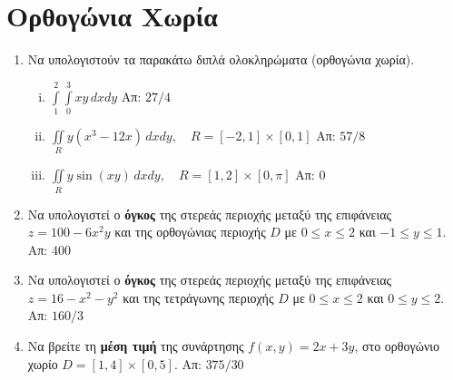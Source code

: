 



\geometry{top=2cm}
\pagestyle{askhseis}
\everymath{\displaystyle}




\begin{center}
  \minibox{\large\bf \textcolor{Col1}{Ασκήσεις Διπλό Ολοκλήρωμα}}
\end{center}


\section*{Ορθογώνια Χωρία}

\begin{enumerate}
  \item Να υπολογιστούν τα παρακάτω διπλά ολοκληρώματα (ορθογώνια χωρία).
    \begin{enumerate}[i)]
      \item $\int\limits_1^2\!\!\!\int\limits_0^ 3xy\,dxdy$ 
        \hfill Απ: ${27}/{4}$ %
      \item $\iint\limits_{R}y(x^3-12x)\,dxdy,\quad R=[-2,1]\times[0,1]$ 
        \hfill Απ: ${57}/{8}$
      \item $ \iint\limits_{R}y\sin(xy)\,dxdy, \quad R=[1,2]\times[0,\pi] $ 
        \hfill Απ: $ 0 $ 
    \end{enumerate}

  \item Να υπολογιστεί ο \textbf{όγκος} της στερεάς περιοχής μεταξύ της επιφάνειας 
    $ z = 100 - 6x^{2}y $ και της ορθογώνιας περιοχής $D$ με 
    $ 0 \leq x \leq 2 $ και $ -1 \leq y \leq 1 $. \hfill Απ: $400$ 

  \item Να υπολογιστεί ο \textbf{όγκος} της στερεάς περιοχής μεταξύ της 
    επιφάνειας $ z= 16-x^{2}-y^{2} $ και της τετράγωνης περιοχής $D$ με 
    $ 0 \leq x \leq 2 $ και $ 0 \leq y \leq 2 $. \hfill Απ: $160/3$ 

  \item Να βρείτε τη \textbf{μέση τιμή} της συνάρτησης $ f(x,y)=2x+3y $, στο 
    ορθογώνιο χωρίο $D= [1,4] \times [0,5]$.
    \hfill Απ: $ {375}/{30} $ 




\end{enumerate}
